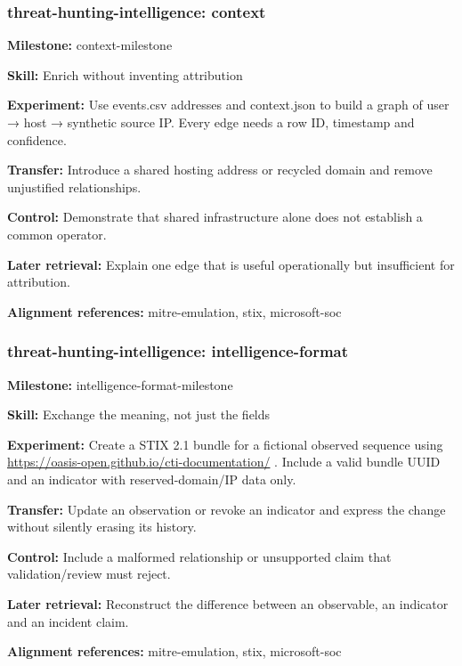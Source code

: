 \subsubsection{threat-hunting-intelligence: context}
\noindent\textbf{Milestone:} context-milestone\par
\noindent\textbf{Skill:} Enrich without inventing attribution\par
\noindent\textbf{Experiment:} Use events.csv addresses and context.json to build a graph of user → host → synthetic source IP. Every edge needs a row ID, timestamp and confidence.\par
\noindent\textbf{Transfer:} Introduce a shared hosting address or recycled domain and remove unjustified relationships.\par
\noindent\textbf{Control:} Demonstrate that shared infrastructure alone does not establish a common operator.\par
\noindent\textbf{Later retrieval:} Explain one edge that is useful operationally but insufficient for attribution.\par
\noindent\textbf{Alignment references:} mitre-emulation, stix, microsoft-soc\par
\subsubsection{threat-hunting-intelligence: intelligence-format}
\noindent\textbf{Milestone:} intelligence-format-milestone\par
\noindent\textbf{Skill:} Exchange the meaning, not just the fields\par
\noindent\textbf{Experiment:} Create a STIX 2.1 bundle for a fictional observed sequence using \url{https://oasis-open.github.io/cti-documentation/} . Include a valid bundle UUID and an indicator with reserved-domain/IP data only.\par
\noindent\textbf{Transfer:} Update an observation or revoke an indicator and express the change without silently erasing its history.\par
\noindent\textbf{Control:} Include a malformed relationship or unsupported claim that validation/review must reject.\par
\noindent\textbf{Later retrieval:} Reconstruct the difference between an observable, an indicator and an incident claim.\par
\noindent\textbf{Alignment references:} mitre-emulation, stix, microsoft-soc\par
